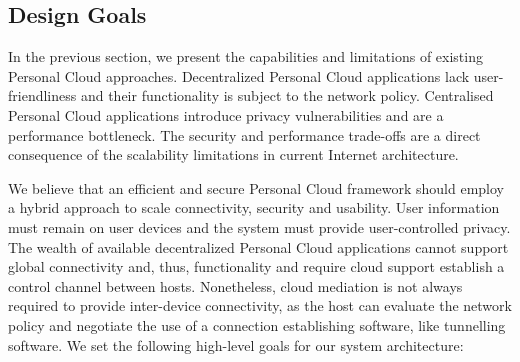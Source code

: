 \begin{itemize}
\end{itemize}

\subsection{Design Goals} \label{sec:sp-challenges}

In the previous section, we present the capabilities and limitations of existing
Personal Cloud approaches. Decentralized Personal Cloud applications lack
user-friendliness and their functionality is subject to the network policy.
Centralised Personal Cloud applications introduce privacy vulnerabilities and
are a performance bottleneck. The security and performance trade-offs are a
direct consequence of the scalability limitations in current Internet
architecture. 

We believe that an efficient and secure Personal Cloud framework should employ a
hybrid approach to scale connectivity, security and usability.  User information
must remain on user devices and the system must provide user-controlled privacy.
The wealth of available decentralized Personal Cloud applications cannot support
global connectivity and, thus, functionality and require  cloud support
establish  a control channel between hosts. Nonetheless, cloud mediation is not
always required to provide inter-device connectivity, as the host can evaluate
the network policy and negotiate the use of a connection establishing software,
like tunnelling software.  We set the following high-level goals for our system
architecture:

